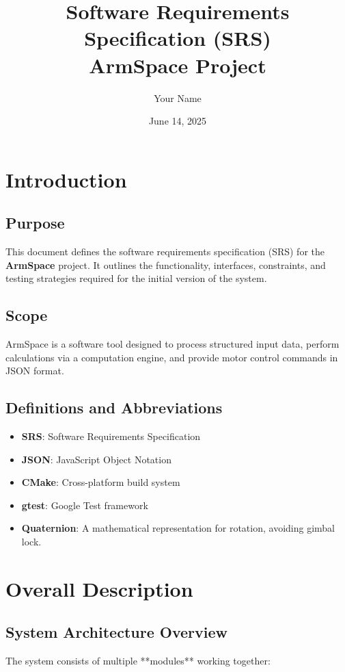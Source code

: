 \documentclass{article}
\title{Software Requirements Specification (SRS) \\ ArmSpace Project}
\author{Your Name}
\date{June 14, 2025}
\begin{document}
\maketitle

\tableofcontents

\section{Introduction}
\subsection{Purpose}
This document defines the software requirements specification (SRS) for the \textbf{ArmSpace} project. It outlines the functionality, interfaces, constraints, and testing strategies required for the initial version of the system.

\subsection{Scope}
ArmSpace is a software tool designed to process structured input data, perform calculations via a computation engine, and provide motor control commands in JSON format.

\subsection{Definitions and Abbreviations}
\begin{itemize}
    \item \textbf{SRS}: Software Requirements Specification
    \item \textbf{JSON}: JavaScript Object Notation
    \item \textbf{CMake}: Cross-platform build system
    \item \textbf{gtest}: Google Test framework
    \item \textbf{Quaternion}: A mathematical representation for rotation, avoiding gimbal lock.
\end{itemize}

\section{Overall Description}
\subsection{System Architecture Overview}
The system consists of multiple **modules** working together:
\end{document}

